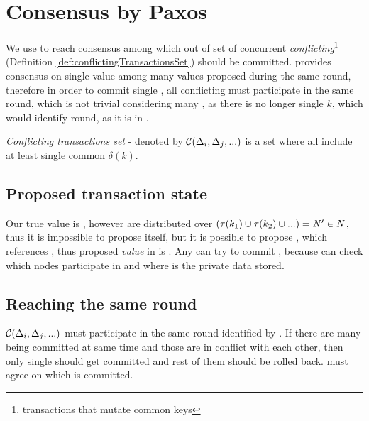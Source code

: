 
\section{Consensus by Paxos}
We use \paxos to reach consensus among \nodesTx which \transaction out of set of concurrent \emph{conflicting}\footnote{transactions that mutate common keys} \transactions (Definition \ref{def:conflictingTransactionsSet}) should be committed. \paxos provides consensus on single value among many values proposed during the same \paxos round, therefore in order to commit single \transaction, all conflicting \transactions must participate in the same \paxos round, which is not trivial considering many \mutationsFull, as there is no longer single $k$, which would identify \paxos round, as it is in \lwt.

\begin{definition}
\label{def:conflictingTransactionsSet}
\emph{Conflicting transactions set} - denoted by $\mathcal{C}\text{$(\Delta_{i}, \Delta_{j}, ...)$}$ is a set where all \transactions include at least single common $\delta(k)$.
\end{definition}

\subsection{Proposed transaction state}
Our true value is \transactionFull, however \mutationsFull are distributed over 
$(\tau(k_1) \cup \tau(k_2) \cup ... ) =  \text{$\mathit{N'}$}\in\mathit{N}$, thus it is impossible to propose \transaction itself, but it is possible to propose \txState, which references \mutations, thus proposed \paxos \emph{value} in \mpt is \txState. Any  can try to commit \transaction, because  can check which nodes participate in \transaction and where is the private data stored. 



\subsection{Reaching the same \paxos round}
$\mathcal{C}\text{$(\Delta_{i}, \Delta_{j}, ...)$}$ must participate in the same \paxos round identified by \paxosRoundId.
If there are many \transactions being committed at same time and those \transactions are in conflict with each other, then only single \transaction should get committed and rest of them should be rolled back. \nodesTx must agree on which \transaction is committed.

